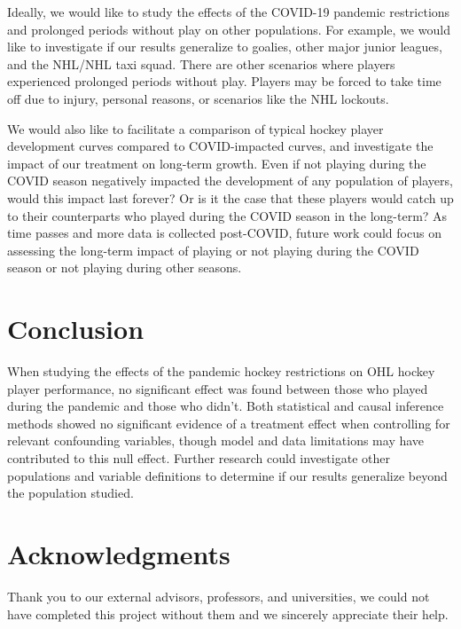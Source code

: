 \documentclass[12pt]{article}
\begin{document}
Ideally, we would like to study the effects of the COVID-19 pandemic
restrictions and prolonged periods without play on other populations.
For example, we would like to investigate if our results generalize to
goalies, other major junior leagues, and the NHL/NHL taxi squad. There
are other scenarios where players experienced prolonged periods without
play. Players may be forced to take time off due to injury, personal
reasons, or scenarios like the NHL lockouts.

We would also like to facilitate a comparison of typical hockey player
development curves compared to COVID-impacted curves, and investigate
the impact of our treatment on long-term growth. Even if not playing
during the COVID season negatively impacted the development of any
population of players, would this impact last forever? Or is it the case
that these players would catch up to their counterparts who played
during the COVID season in the long-term? As time passes and more data
is collected post-COVID, future work could focus on assessing the
long-term impact of playing or not playing during the COVID season or
not playing during other seasons.

\hypertarget{conclusion}{%
\section{Conclusion}\label{conclusion}}

When studying the effects of the pandemic hockey restrictions on OHL
hockey player performance, no significant effect was found between those
who played during the pandemic and those who didn't. Both statistical
and causal inference methods showed no significant evidence of a
treatment effect when controlling for relevant confounding variables,
though model and data limitations may have contributed to this null
effect. Further research could investigate other populations and
variable definitions to determine if our results generalize beyond the
population studied.

\hypertarget{acknowledgments}{%
\section{Acknowledgments}\label{acknowledgments}}

Thank you to our external advisors, professors, and universities, we
could not have completed this project without them and we sincerely
appreciate their help.

\pagebreak



\end{document}
